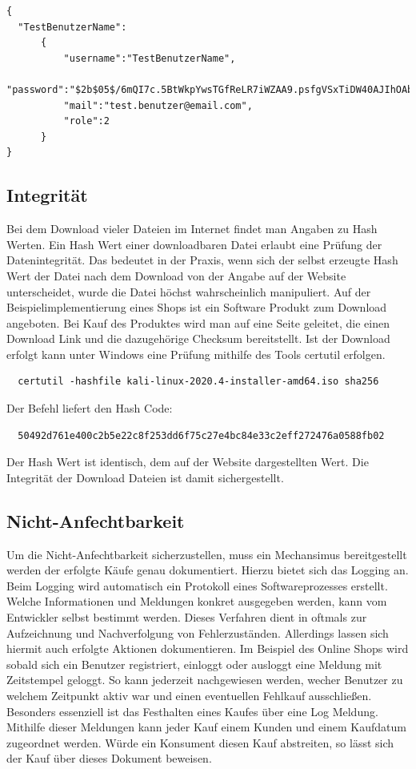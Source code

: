 \documentclass[utf8,biblatex]{lni}
\begin{document}
\begin{verbatim}
{
  "TestBenutzerName":
      {
          "username":"TestBenutzerName",
          "password":"$2b$05$/6mQI7c.5BtWkpYwsTGfReLR7iWZAA9.psfgVSxTiDW40AJIhOAbS",
          "mail":"test.benutzer@email.com",
          "role":2
      }
}
\end{verbatim}

\subsection{Integrität}

Bei dem Download vieler Dateien im Internet findet man Angaben zu Hash Werten. 
Ein Hash Wert einer downloadbaren Datei erlaubt eine Prüfung der Datenintegrität. 
Das bedeutet in der Praxis, wenn sich der selbst erzeugte Hash Wert der Datei nach dem Download 
von der Angabe auf der Website unterscheidet, wurde die Datei höchst wahrscheinlich manipuliert. 
Auf der Beispielimplementierung eines Shops ist ein Software Produkt zum Download angeboten. 
Bei Kauf des Produktes wird man auf eine Seite geleitet, die einen Download Link und die 
dazugehörige Checksum bereitstellt. 
Ist der Download erfolgt kann unter Windows eine Prüfung mithilfe des Tools \glqq certutil\grqq{}  erfolgen. 

\begin{verbatim}
  certutil -hashfile kali-linux-2020.4-installer-amd64.iso sha256
\end{verbatim}

Der Befehl liefert den Hash Code: 

\begin{verbatim}
  50492d761e400c2b5e22c8f253dd6f75c27e4bc84e33c2eff272476a0588fb02
\end{verbatim}

Der Hash Wert ist identisch, dem auf der Website dargestellten Wert. 
Die Integrität der Download Dateien ist damit sichergestellt. 

\subsection{Nicht-Anfechtbarkeit}

Um die Nicht-Anfechtbarkeit sicherzustellen, muss ein Mechansimus bereitgestellt werden der erfolgte Käufe genau dokumentiert. Hierzu bietet sich das Logging an. Beim Logging wird automatisch ein Protokoll
eines Softwareprozesses erstellt. Welche Informationen und Meldungen konkret ausgegeben werden, kann vom Entwickler selbst bestimmt werden. Dieses Verfahren dient in oftmals zur Aufzeichnung und Nachverfolgung
von Fehlerzuständen. Allerdings lassen sich hiermit auch erfolgte Aktionen dokumentieren. Im Beispiel des Online Shops wird sobald sich ein Benutzer registriert, einloggt oder ausloggt eine Meldung mit Zeitstempel geloggt.
So kann jederzeit nachgewiesen werden, wecher Benutzer zu welchem Zeitpunkt aktiv war und einen eventuellen Fehlkauf ausschließen. Besonders essenziell ist das Festhalten  eines Kaufes über eine Log Meldung. Mithilfe
dieser Meldungen kann jeder Kauf einem Kunden und einem Kaufdatum zugeordnet werden. Würde ein Konsument diesen Kauf abstreiten, so lässt sich der Kauf über dieses Dokument beweisen. 
\end{document}
